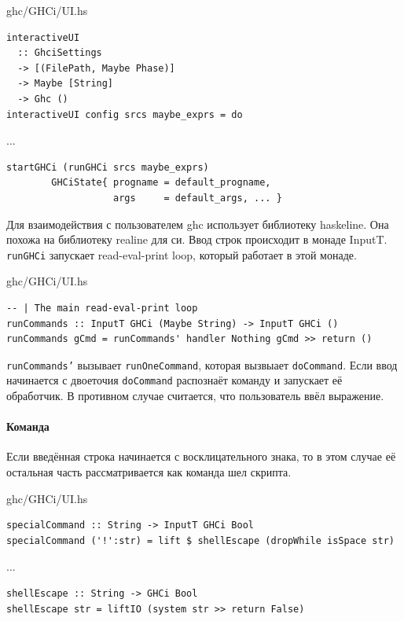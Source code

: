 \documentclass[fontsize=14pt, paper=a4, pagesize, DIV=calc]{scrartcl}
\def\code#1{\texttt{#1}}
\begin{document}
\begin{ListingEnv}
\caption{ghc/GHCi/UI.hs}
\begin{lstlisting}[firstnumber=400]
interactiveUI 
  :: GhciSettings 
  -> [(FilePath, Maybe Phase)] 
  -> Maybe [String]
  -> Ghc ()
interactiveUI config srcs maybe_exprs = do
\end{lstlisting}
...
\begin{lstlisting}[firstnumber=454]
    startGHCi (runGHCi srcs maybe_exprs)
        GHCiState{ progname = default_progname,
                   args     = default_args, ... }
\end{lstlisting}
\end{ListingEnv}

Для взаимодействия с пользователем ghc использует библиотеку haskeline. Она
похожа на библиотеку realine для си. Ввод строк происходит в монаде InputT.
\code{runGHCi} запускает read-eval-print loop, который работает в этой монаде.

\begin{ListingEnv}
\caption{ghc/GHCi/UI.hs}
\begin{lstlisting}[firstnumber=892]
-- | The main read-eval-print loop
runCommands :: InputT GHCi (Maybe String) -> InputT GHCi ()
runCommands gCmd = runCommands' handler Nothing gCmd >> return ()
\end{lstlisting}
\end{ListingEnv}

\code{runCommands'} вызывает \code{runOneCommand}, которая вызвыает
\code{doCommand}. Если ввод начинается с двоеточия \code{doCommand} распознаёт
команду и запускает её обработчик. В противном случае считается, что
пользователь ввёл выражение.

\paragraph{Команда}

Если введённая строка начинается с восклицательного знака, то в этом случае её
остальная часть рассматривается как команда шел скрипта.

\begin{ListingEnv}
\caption{ghc/GHCi/UI.hs}
\begin{lstlisting}[firstnumber=1204]
specialCommand :: String -> InputT GHCi Bool
specialCommand ('!':str) = lift $ shellEscape (dropWhile isSpace str)
\end{lstlisting}
...
\begin{lstlisting}[firstnumber=1221]
shellEscape :: String -> GHCi Bool
shellEscape str = liftIO (system str >> return False)
\end{lstlisting}
\end{ListingEnv}
\end{document}
